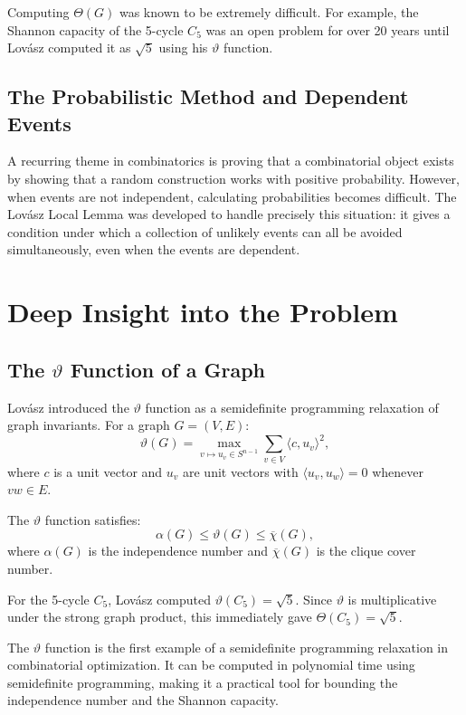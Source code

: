 Computing $\Theta(G)$ was known to be extremely difficult. For example, the Shannon capacity of the 5-cycle $C_5$ was an open problem for over 20 years until Lov\'asz computed it as $\sqrt{5}$ using his $\vartheta$ function.

\subsection{The Probabilistic Method and Dependent Events}

A recurring theme in combinatorics is proving that a combinatorial object exists by showing that a random construction works with positive probability. However, when events are not independent, calculating probabilities becomes difficult. The Lov\'asz Local Lemma was developed to handle precisely this situation: it gives a condition under which a collection of unlikely events can all be avoided simultaneously, even when the events are dependent.

\section{Deep Insight into the Problem}

\subsection{The \texorpdfstring{$\vartheta$}{theta} Function of a Graph}

Lov\'asz introduced the $\vartheta$ function as a semidefinite programming relaxation of graph invariants. For a graph $G = (V,E)$:
\[
\vartheta(G) = \max_{v \mapsto u_v \in S^{n-1}} \sum_{v \in V} \langle c, u_v \rangle^2,
\]
where $c$ is a unit vector and $u_v$ are unit vectors with $\langle u_v, u_w \rangle = 0$ whenever $vw \in E$.

The $\vartheta$ function satisfies:
\[
\alpha(G) \leq \vartheta(G) \leq \overline{\chi}(G),
\]
where $\alpha(G)$ is the independence number and $\overline{\chi}(G)$ is the clique cover number.

For the 5-cycle $C_5$, Lov\'asz computed $\vartheta(C_5) = \sqrt{5}$. Since $\vartheta$ is multiplicative under the strong graph product, this immediately gave $\Theta(C_5) = \sqrt{5}$.

The $\vartheta$ function is the first example of a semidefinite programming relaxation in combinatorial optimization. It can be computed in polynomial time using semidefinite programming, making it a practical tool for bounding the independence number and the Shannon capacity.

